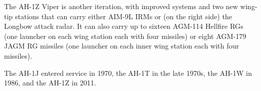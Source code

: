 The AH-1Z Viper is another iteration, with improved systems and two new wing-tip stations that can carry either AIM-9L IRMs or (on the right side) the Longbow attack radar. It can also carry up to sixteen AGM-114 Hellfire RGs (one launcher on each wing station each with four missiles) or eight AGM-179 JAGM RG missiles (one launcher on each inner wing station each with four missiles).

The AH-1J entered service in 1970, the AH-1T in the late 1970s, the AH-1W in 1986, and the AH-1Z in 2011.
